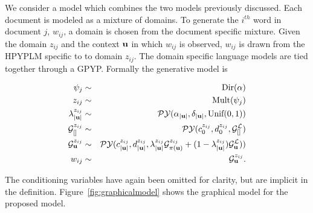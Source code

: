 We consider a model which combines the two models previously discussed.  Each document is modeled as a mixture of domains.  To generate the $i^{th}$ word in document $j$, $w_{ij}$, a domain is chosen from the document specific mixture.  Given the domain $z_{ij}$ and the context $\bu$ in which $w_{ij}$ is observed, $w_{ij}$ is drawn from the HPYPLM specific to to domain $z_{ij}$.  The domain specific language models are tied together through a GPYP.  Formally the generative model is

\begin{eqnarray}
\psi_j  &\sim& \textrm{Dir}(\alpha) \nonumber\\
z_{ij}  &\sim& \textrm{Mult}(\psi_j) \nonumber\\
\lambda^{z_{ij}}_{|\bu|} &\sim& \PY(\alpha_{|\bu|}, \delta_{|\bu|}, \textrm{Unif}(0,1)) \nonumber \\
\G^{z_{ij}}_{[]} &\sim& \PY(c^{ z_{ij}}_0, d^{ z_{ij}}_0,\G^\LA_{[]}) \nonumber \\
\G^{ z_{ij}}_\bu &\sim& \PY(c^{ z_{ij}}_{|\bu|}, d^{ z_{ij}}_{|\bu|}, \lambda^{ z_{ij}}_{|\bu|}\G^{ z_{ij}}_{\pi(\bu)} + (1-\lambda^{ z_{ij}}_{|\bu|})\G^\LA_\bu)) \nonumber \\ 
w_{ij}  &\sim& \G^{z_{ij}}_\bu \nonumber.
\end{eqnarray}

The conditioning variables have again been omitted for clarity, but are implicit in the definition.  Figure~\ref{fig:graphicalmodel} shows the graphical model for the proposed model.

